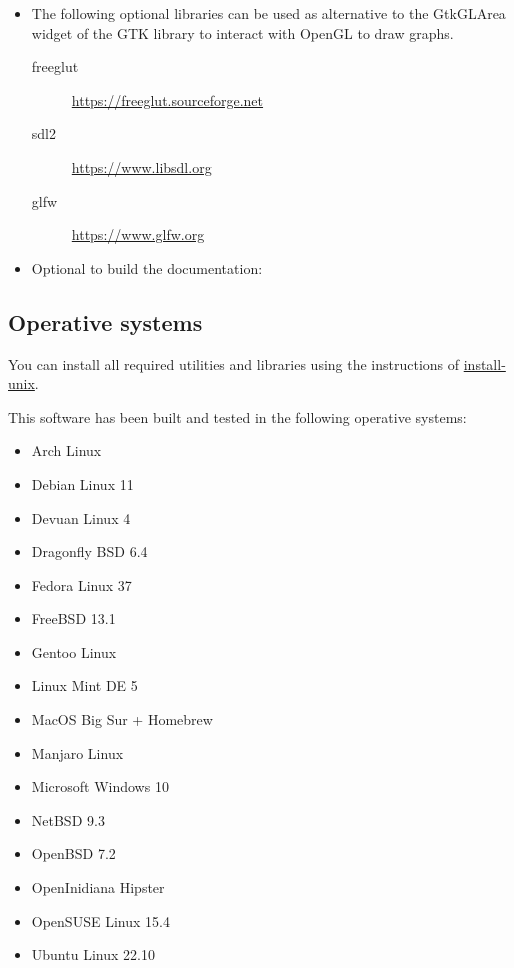 \begin{itemize}
\item The following optional libraries can be used as alternative to the
GtkGLArea widget of the GTK library to interact with OpenGL to draw graphs.
\begin{description}
\item[freeglut]\url{https://freeglut.sourceforge.net}
\item[sdl2]\url{https://www.libsdl.org}
\item[glfw]\url{https://www.glfw.org}
\end{description}

\item Optional to build the documentation:

\end{itemize}

\subsection{Operative systems}

You can install all required utilities and libraries using the instructions of
\href{https://github.com/jburguete/install-unix}{install-unix}.

This software has been built and tested in the following operative systems:
\begin{itemize}
\item Arch Linux
\item Debian Linux 11
\item Devuan Linux 4
\item Dragonfly BSD 6.4
\item Fedora Linux 37
\item FreeBSD 13.1
\item Gentoo Linux
\item Linux Mint DE 5
\item MacOS Big Sur + Homebrew
\item Manjaro Linux
\item Microsoft Windows 10
\item NetBSD 9.3
\item OpenBSD 7.2
\item OpenInidiana Hipster
\item OpenSUSE Linux 15.4
\item Ubuntu Linux 22.10
\end{itemize}


